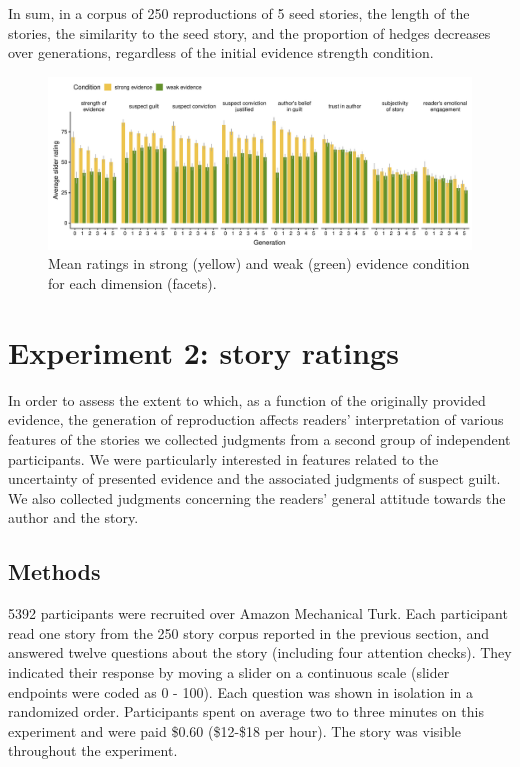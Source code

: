 \documentclass[10pt,letterpaper]{article}
\begin{document}
In sum, in a corpus of 250 reproductions of 5 seed stories, the length of the stories, the similarity to the seed story, and the proportion of hedges decreases over generations, regardless of the initial evidence strength condition.

\begin{figure}[]
	\includegraphics[width=\textwidth]{pics/subj_results_byquestion.pdf}
	\caption{Mean ratings in strong (yellow) and weak (green) evidence condition for each dimension (facets).} 
	\label{fig:exp2results}
\end{figure}

\section{Experiment 2: story ratings}

In order to assess the extent to which, as a function of the originally provided evidence, the generation of reproduction affects readers' interpretation of various features of the stories we collected judgments from a second group of independent participants. We were particularly interested in features related to the uncertainty of presented evidence and the associated judgments of suspect guilt. We also collected judgments concerning the readers' general attitude towards the author and the story.

\subsection{Methods}

5392 participants were recruited over Amazon Mechanical Turk. Each participant read one story from the 250 story corpus reported in the previous section, and answered twelve questions about the story (including four attention checks). They indicated their response by moving a slider on a continuous scale (slider endpoints were coded as 0 - 100). Each question was shown in isolation in a randomized order. Participants spent on average two to three minutes on this experiment and were paid \$0.60 (\$12-\$18 per hour). The story was visible throughout the experiment.
\end{document}
